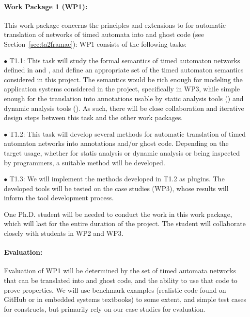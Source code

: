 \paragraph{Work Package 1 (WP1):} This work package concerns the
principles and extensions to \framac for automatic translation of
networks of timed automata into \acsl and ghost code (see Section~\ref{sec:ta2framac}):
WP1 consists of the following tasks:


$\bullet$ T1.1: This task will study the formal semantics of timed automaton networks defined in \uppaal and \prism, and define an appropriate set of the timed automaton semantics considered in this project.  The semantics would be rich enough for modeling the application systems considered in the project, specifically in WP3, while simple enough for the translation into annotations usable by static analysis tools (\framac) and dynamic analysis tools (\deepstate).  As such, there will be close collaboration and iterative design steps between this task and the other work packages. %

$\bullet$ T1.2: This task will develop several methods for automatic translation of timed automaton networks into \acsl annotations and/or ghost code.  Depending on the target usage, whether for statis analysis or dynamic analysis or being inspected by programmers, a suitable method will be developed.

$\bullet$ T1.3: We will implement the methods developed in T1.2 as \framac plugins.
The developed tools will be tested on the case studies (WP3), whose results will inform the tool development process.

One Ph.D. student will be needed to conduct the work in this work package, which will last for the entire duration of the project.
The student will collaborate closely with students in WP2 and WP3.

\paragraph{Evaluation:} Evaluation of
WP1 will be determined by the set of timed automata
networks that can be translated into \acsl and ghost code, and the
ability to use that code to prove properties.  We will use benchmark
examples (realistic code found on GitHub or in embedded systems
textbooks) to some extent, and simple test cases for constructs, but
primarily rely on our case studies for evaluation.


